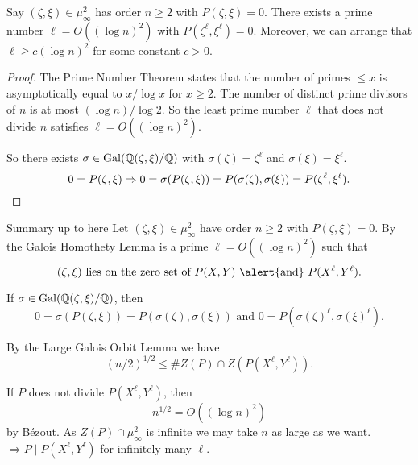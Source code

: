 \documentclass{beamer}
\begin{document}
\begin{frame}
  \begin{lemma}
    Say $(\zeta,\xi)\in \mu_\infty^2$ has order $n\ge 2$
    with $P(\zeta,\xi)=0$. There exists a prime number $\ell=O((\log
    n)^2)$ with $P(\zeta^\ell,\xi^\ell)=0$.
    Moreover, we can arrange that $\ell \ge c (\log n)^2$ for some
    constant $c>0$. 
  \end{lemma}
  \begin{proof}
    The Prime Number Theorem states that the number of primes $\le x$ is
    asymptotically equal to $x/\log x$ for $x\ge 2$.
    The number of
    distinct prime divisors of $n$ is at most $(\log n)/\log 2$.
    So the least prime number $\ell$ that does not divide $n$ satisfies $\ell =
    O((\log n)^2)$.

    So there exists $\sigma\in\mathrm{Gal}({\mathbb{Q}}(\zeta,\xi)/{\mathbb{Q}})$ with
    $\sigma(\zeta)=\zeta^\ell$ and
    $\sigma(\xi)=\xi^\ell$.
    $$0=P(\zeta,\xi)\Rightarrow
    0=\sigma(P(\zeta,\xi))=P(\sigma(\zeta),\sigma(\xi)) =
    P(\zeta^\ell,\xi^\ell).\qedhere$$
  \end{proof}
\end{frame}

\begin{frame}{Summary up to here}
  Let $(\zeta,\xi)\in \mu_\infty^2$ have order $n\ge 2$ with
  $P(\zeta,\xi)=0$. By the \alert{Galois Homothety Lemma} is a prime  $\ell = O((\log n)^2)$ such that
  \begin{equation}
    (\zeta,\xi)\text{ lies on the zero set of $P(X,Y)$ \alert{and} 
      $P(X^{\ell},Y^{\ell})$}.
  \end{equation}

  If $\sigma\in \mathrm{Gal}({\mathbb{Q}}(\zeta,\xi)/{\mathbb{Q}})$, then
  $$
  0 = \sigma(P(\zeta,\xi)) = P(\sigma(\zeta),\sigma(\xi))
  \text{ and }
  0 = P(\sigma(\zeta)^\ell,\sigma(\xi)^\ell).
  $$

  By the \alert{Large Galois Orbit Lemma} we have
  $$
  (n/2)^{1/2} \le \# Z(P)\cap Z(P(X^\ell,Y^\ell)).
  $$
  
  If $P$ does not divide $P(X^\ell,Y^\ell)$,
  then 
  \begin{equation*}
    n^{1/2} = O((\log n)^2)
  \end{equation*}
  by B\'ezout.
  As $Z(P)\cap\mu_\infty^2$ is infinite  we may take $n$
  as large as we want. $\Rightarrow   P \mid P(X^\ell,Y^\ell)$ for
  infinitely many $\ell$.
\end{frame}
\end{document}
